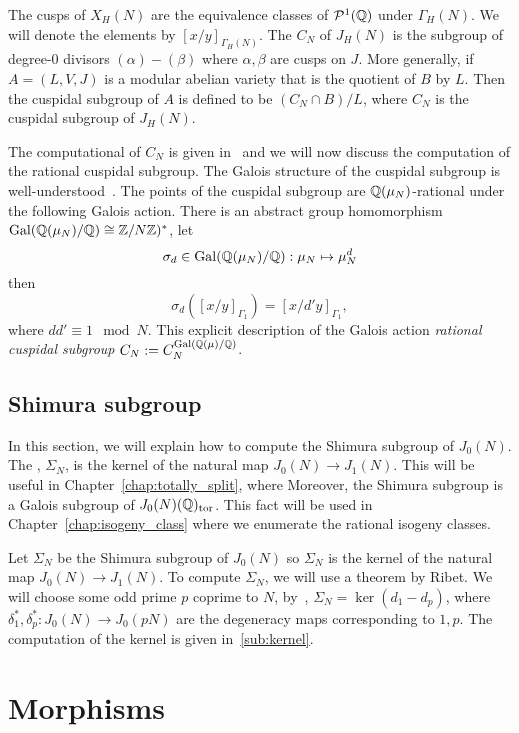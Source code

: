 The cusps of $X_H(N)$ are the equivalence classes of $\mathcal{P}^1(\mathbb{Q})$ under
$\Gamma_H(N)$. We will denote the elements by $[x/y]_{\Gamma_H(N)}$. The
 $C_N$ of $J_H(N)$ is the subgroup of degree-0 divisors
$(\alpha)-(\beta)$ where $\alpha, \beta$ are cusps on $J$. More generally, if
$A=(L, V, J)$ is a modular abelian variety that is the quotient of $B$ by $L$.
Then the cuspidal subgroup of $A$ is defined to be $(C_N\cap B)/L$, where $C_N$ is
the cuspidal subgroup of $J_H(N)$.

The computational of $C_N$ is given in~\cite[\S 3.8]{stein:phd} and we will now
discuss the computation of the rational cuspidal subgroup. The Galois structure
of the cuspidal subgroup is well-understood~\cite[\S 1.3]{stevens:thesis}. The
points of the cuspidal subgroup are $\mathbb{Q}(\mu_N)$-rational under the following
Galois action. There is an abstract group homomorphism
$\operatorname{Gal}(\mathbb{Q}(\mu_N)/\mathbb{Q})\cong \mathbb{Z}/N\mathbb{Z})^*$, let
\[
    \sigma_d\in \operatorname{Gal}(\mathbb{Q}(\mu_N)/\mathbb{Q}):\mu_N\mapsto \mu_N ^d
\]
then
\[
    \sigma_d([x/y]_{\Gamma_1})=[x/d'y]_{\Gamma_1},
\]
where $dd'\equiv 1 \mod{N}$. This explicit description of the Galois action
\emph{rational cuspidal subgroup} $C_N:=C_N ^{\operatorname{Gal}(\mathbb{Q}(\mu)/\mathbb{Q})}$.

\subsection{Shimura subgroup}%
\label{sub:shimura}

In this section, we will explain how to compute the Shimura subgroup of
$J_0(N)$. The , $\Sigma_N$, is the kernel of the natural
map $J_0(N)\to J_1(N)$. This will be useful in
Chapter~\ref{chap:totally_split}, where Moreover, the Shimura subgroup is a
Galois subgroup of $J_0(N)(\mathbb{Q})_{\mathrm{tor}}$. This fact will be used in
Chapter~\ref{chap:isogeny_class} where we enumerate the rational isogeny
classes.

Let $\Sigma_N$ be the Shimura subgroup of $J_0(N)$ so $\Sigma_N$ is the kernel
of the natural map $J_0(N)\to J_1(N)$. To compute $\Sigma_N$, we will use a
theorem by Ribet. We will choose some odd prime $p$ coprime to $N$,
by~\cite[Prop. 1]{ribet:raising}, $\Sigma_N=\ker(d_1-d_p)$, where $\delta_1
^*,\delta_p ^*:J_0(N)\to J_0(pN)$ are the degeneracy maps corresponding to
$1,p$. The computation of the kernel is given in~\ref{sub:kernel}.

\section{Morphisms}%
\label{sec:morphisms}


